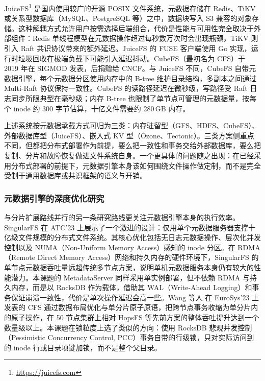 JuiceFS\footnote{\url{https://juicefs.com}} 是国内使用较广的开源 POSIX 文件系统，元数据存储在 Redis、TiKV 或关系型数据库（MySQL、PostgreSQL 等）之中，数据块写入 S3 兼容的对象存储。这种解耦方式允许用户按需选择后端组合，代价是性能与可用性完全取决于外部组件：Redis 单线程模型在元数据操作超过每秒数万次时会出现瓶颈，TiKV 则引入 Raft 共识协议带来的额外延迟。JuiceFS 的 FUSE 客户端使用 Go 实现，运行时垃圾回收在极端负载下可能引入延迟抖动。CubeFS\cite{liu2019cubefs}（最初名为 CFS）于 2019 年在 SIGMOD 发表，后捐赠给 CNCF。与 JuiceFS 不同，CubeFS 自带元数据引擎，每个元数据分区使用内存中的 B-tree 维护目录结构，多副本之间通过 Multi-Raft 协议保持一致性。CubeFS 的读路径延迟在微秒级，写路径受 Raft 日志同步所限典型在毫秒级；内存 B-tree 也限制了单节点可管理的元数据量，按每个 inode 约 300 字节估算，十亿文件需要约 280\,GB 内存。

上述系统按元数据承载方式可归为三类：内存驻留型（GFS、HDFS、CubeFS）、外部数据库型（JuiceFS）、嵌入式 KV 型（Ozone、Tectonic）。三类方案侧重点不同，但都把分布式部署作为前提，要么把一致性和事务交给外部数据库，要么把复制、分片和故障恢复做进文件系统自身。一个更具体的问题随之出现：在已经采用分布式部署的前提下，元数据引擎本身该如何围绕文件操作做定制，而不是完全受制于通用数据库或共识框架的语义与开销。

\subsubsection{元数据引擎的深度优化研究}

与分片扩展路线并行的另一条研究路线更关注元数据引擎本身的执行效率。SingularFS\cite{guo2023singularfs} 在 ATC'23 上展示了一个激进的设计：仅用单个元数据服务器支撑十亿级文件规模的分布式文件系统。其核心优化包括无日志元数据操作、层次化并发控制以及 NUMA（Non-Uniform Memory Access）感知的 inode 分区。在 RDMA（Remote Direct Memory Access）网络和持久内存的硬件环境下，SingularFS 的单节点元数据吞吐量远超传统多节点方案，说明单机元数据服务本身仍有较大的性能潜力。本课题的 MetadataServer 同样采用单实例部署，但不依赖 RDMA 与持久内存，而是以 RocksDB 作为载体，借助其 WAL（Write-Ahead Logging）和事务保证崩溃一致性，代价是单次操作延迟会高一些。Wang 等人\cite{wang2023cfs} 在 EuroSys'23 上发表的 CFS 通过数据布局优化与单分片原子原语，把跨节点事务收缩为单分片内的原子操作，在 50 节点集群上相对 HopsFS 等先前方案的整体吞吐提升达到一个数量级以上。本课题在锁粒度上选了类似的方向：使用 RocksDB 悲观并发控制（Pessimistic Concurrency Control, PCC）事务自带的行级锁，只对实际访问到的 inode 行或目录项键加锁，而不是整个父目录。

